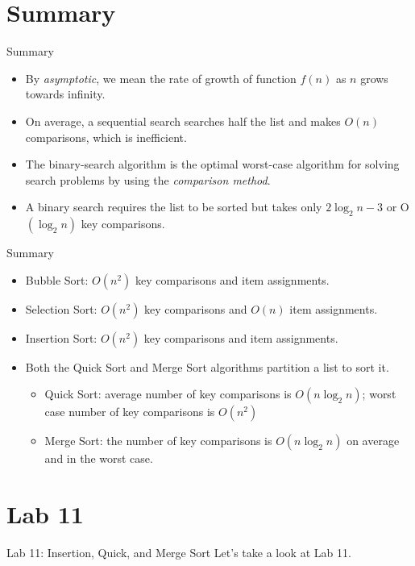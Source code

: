 \documentclass[14pt,aspectratio=1610]{beamer}
\begin{document}
\section{Summary}
\begin{frame}{Summary}
\begin{itemize}[<+->]
\item
  By \emph{asymptotic}, we mean the rate of growth of function $f(n)$ as $n$ grows towards infinity.
\item
  On average, a sequential search searches half the list and makes $O(n)$ comparisons, which is inefficient.
\item
  The binary-search algorithm is the optimal worst-case algorithm for solving search problems by using the \textit{comparison method}.
\item
  A binary search requires the list to be sorted but takes only $2\log_2n - 3$ or O$(\log_2n)$ key comparisons.
\end{itemize}
\end{frame}


\begin{frame}{Summary}
\begin{itemize}[<+->]
\item
  Bubble Sort: $O(n^2)$ key comparisons and item assignments.
\item
  Selection Sort: $O(n^2)$ key comparisons and $O(n)$ item assignments.
\item
  Insertion Sort: $O(n^2)$ key comparisons and item assignments.
\item
  Both the Quick Sort and Merge Sort algorithms partition a list to sort it.
  \begin{itemize}
    \item
      Quick Sort: average number of key comparisons is $O(n\log_2n)$; worst case number of key comparisons is $O(n^2)$
    \item
      Merge Sort: the number of key comparisons is $O(n\log_2n)$ on average and in the worst case.
  \end{itemize}
\end{itemize}
\end{frame}

\section*{Lab 11}
\begin{frame}{Lab 11: Insertion, Quick, and Merge Sort}
\centering\Large
  Let's take a look at Lab 11.
\end{frame}
\end{document}
